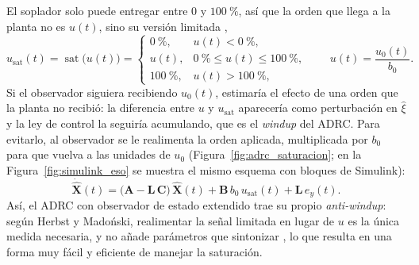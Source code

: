 El soplador solo puede entregar entre $0$ y $100~\%$, así que la orden que
llega a la planta no es $u(t)$, sino su versión limitada
\cite[sec.~9.1.1]{herbst2024adrc},
\begin{equation}
u_{\mathrm{sat}}(t) = \operatorname{sat}\bigl(u(t)\bigr) =
\begin{cases}
0~\%, & u(t) < 0~\%, \\
u(t), & 0~\% \le u(t) \le 100~\%, \\
100~\%, & u(t) > 100~\%,
\end{cases}
\qquad u(t) = \frac{u_0(t)}{b_0}.
\label{eq:saturacion}
\end{equation}
Si el observador siguiera recibiendo $u_0(t)$, estimaría el efecto de una orden
que la planta no recibió: la diferencia entre $u$ y $u_{\mathrm{sat}}$
aparecería como perturbación en $\hat{\xi}$ y la ley de control la seguiría
acumulando, que es el \emph{windup} del ADRC. Para evitarlo, al observador se le
realimenta la orden aplicada, multiplicada por $b_0$ para que vuelva a las
unidades de $u_0$ (Figura~\ref{fig:adrc_saturacion}; en la Figura~\ref{fig:simulink_eso} se
muestra el mismo esquema con bloques de Simulink):
\begin{equation}
\dot{\widehat{\mathbf{X}}}(t) =
\bigl(\mathbf{A} - \mathbf{L}\,\mathbf{C}\bigr)\,\widehat{\mathbf{X}}(t)
+ \mathbf{B}\,b_0\,u_{\mathrm{sat}}(t) + \mathbf{L}\,e_y(t).
\label{eq:observador_saturacion}
\end{equation}
Así, el ADRC con observador de estado extendido trae su propio
\emph{anti-windup}: según Herbst y Madoński, realimentar la señal limitada en
lugar de $u$ es la única medida necesaria, y no añade parámetros que sintonizar
\cite[sec.~9.1.1]{herbst2024adrc}, lo que resulta en una forma muy fácil y eficiente de
manejar la saturación.


